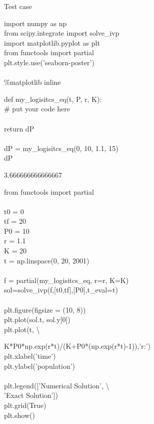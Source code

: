 \begin{posttest}[\textcolor{red}{End of Module 10 Quiz}]
\begin{mysolution}
Test case
\begin{boxB}
import numpy as np\\
from scipy.integrate import solve\_ivp\\
import matplotlib.pyplot as plt\\
from functools import partial\\
plt.style.use('seaborn-poster')\\
\\
\%matplotlib inline
\end{boxB}
\begin{boxB}
def my\_logisitcs\_eq(t, P, r, K):\\
\hspace*{1cm}\# put your code here\\
    \\
\hspace*{1cm}return dP\\
\\
dP = my\_logisitcs\_eq(0, 10, 1.1, 15)\\
dP
\end{boxB}

$3.666666666666667$

\begin{boxB}
from functools import partial\\
\\
t0 = 0\\
tf = 20\\
P0 = 10\\
r = 1.1\\
K = 20\\
t = np.linspace(0, 20, 2001)\\
\\
f = partial(my\_logisitcs\_eq, r=r, K=K)\\
sol=solve\_ivp(f,[t0,tf],[P0],t\_eval=t)\\
\\
plt.figure(figsize = (10, 8))\\
plt.plot(sol.t, sol.y[0])\\
plt.plot(t, \textbackslash\\
\end{boxB}

\begin{boxB}
\hspace*{0.5cm}K*P0*np.exp(r*t)/(K+P0*(np.exp(r*t)-1)),'r:')\\
plt.xlabel('time')\\
plt.ylabel('population')\\
\\
plt.legend(['Numerical Solution', \textbackslash\\
\hspace*{2cm}'Exact Solution'])\\
plt.grid(True)\\
plt.show()\\
\end{boxB}


\end{mysolution}
\end{posttest}
